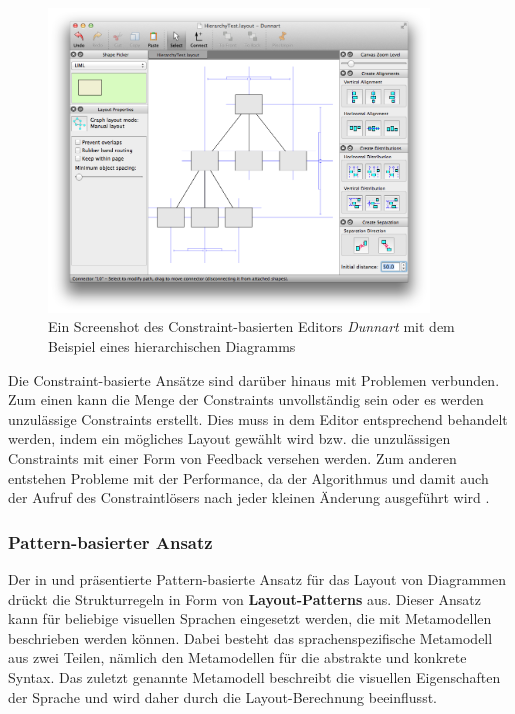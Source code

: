 \begin{figure}[hbt]
    \centering
    \includegraphics[width=0.9\textwidth]{assets/dunnart-screenshot}
    \caption{Ein Screenshot des Constraint-basierten Editors \textit{Dunnart} mit dem Beispiel eines hierarchischen Diagramms}
    \label{fig:dunnart-screenshot}
\end{figure}

Die Constraint-basierte Ansätze sind darüber hinaus mit Problemen verbunden. Zum einen kann die Menge der Constraints unvollständig sein oder es werden unzulässige Constraints erstellt. Dies muss in dem Editor entsprechend behandelt werden, indem ein mögliches Layout gewählt wird bzw. die unzulässigen Constraints mit einer Form von Feedback versehen werden. Zum anderen entstehen Probleme mit der Performance, da der Algorithmus und damit auch der Aufruf des Constraintlösers  nach jeder kleinen Änderung ausgeführt wird \cite{Maier12A-Pattern-based}.

\subsubsection{Pattern-basierter Ansatz}
\label{subsubsec:pattern-based-approach}

Der in \cite{Maier12A-Pattern-based} und \cite{MaierMinas10Combination} präsentierte Pattern-basierte Ansatz für das Layout von Diagrammen drückt die Strukturregeln in Form von \textbf{Layout-Patterns} aus. Dieser Ansatz kann für beliebige visuellen Sprachen eingesetzt werden, die mit Metamodellen beschrieben werden können. Dabei besteht das sprachenspezifische Metamodell aus zwei Teilen, nämlich den Metamodellen für die abstrakte und konkrete Syntax. Das zuletzt genannte Metamodell beschreibt die visuellen Eigenschaften der Sprache und wird daher durch die Layout-Berechnung beeinflusst.

